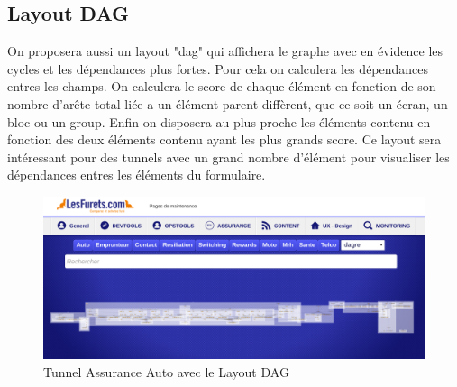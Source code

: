 \subsection{Layout DAG}
On proposera aussi un layout "dag" qui affichera le graphe avec en évidence les cycles et les dépendances plus fortes. Pour cela on calculera les dépendances entres les champs. On calculera le score de chaque élément en fonction de son nombre d'arête total liée a un élément parent diffèrent, que ce soit un écran, un bloc ou un group. Enfin on disposera au plus proche les éléments contenu en fonction des deux éléments contenu ayant les plus grands score. Ce layout sera intéressant pour des tunnels avec un grand nombre d'élément pour visualiser les dépendances entres les éléments du formulaire.
\vspace{0.5in}
\begin{figure}[!h]
\centering
\includegraphics[width=15cm]{outil/layout-dagre.png}
\caption{Tunnel Assurance Auto avec le Layout DAG}
\end{figure}

